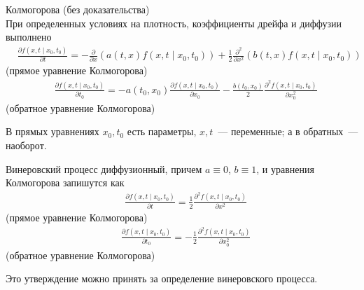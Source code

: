 \begin{theorem} Колмогорова (без доказательства)
    \\
    При определенных условиях на плотность, коэффициенты дрейфа и диффузии
    выполнено
    \begin{align*}
      & \frac{\partial f(x,t \mid x_0,t_0)}{\partial t} = -\frac{\partial}{\partial x}\left( a(t,x)f(x,t\mid x_0,t_0) \right) + \frac{1}{2}\frac{\partial^2}{\partial x^2}\left( b(t,x)f(x,t\mid x_0,t_0) \right)
    \end{align*}
    (прямое уравнение Колмогорова)
    \begin{align*}
      & \frac{\partial f(x,t \mid x_0,t_0)}{\partial t_0} = -a(t_0,x_0) \frac{\partial f(x,t\mid x_0,t_0)}{\partial x_0} - \frac{b(t_0,x_0)}{2} \frac{\partial^2 f(x,t\mid x_0,t_0)}{\partial x_0^2}
    \end{align*}
    (обратное уравнение Колмогорова)  
\end{theorem}
В прямых уравнениях $x_0, t_0$ есть параметры, $x,t$~--- переменные; а в
обратных~--- наоборот.
\begin{Prop}
    Винеровский процесс диффузионный, причем $a \equiv 0$, $b \equiv 1$, и
    уравнения Колмогорова запишутся как
    \begin{align*}
      & \frac{\partial f(x,t \mid x_0,t_0)}{\partial t} = \frac{1}{2}\frac{\partial^2f(x,t\mid x_0,t_0)}{\partial x^2}
    \end{align*}
    (прямое уравнение Колмогорова)
    \begin{align*}
      & \frac{\partial f(x,t \mid x_0,t_0)}{\partial t_0} = - \frac{1}{2} \frac{\partial^2 f(x,t\mid x_0,t_0)}{\partial x_0^2}
    \end{align*}
    (обратное уравнение Колмогорова)    
\end{Prop}
\begin{Note}
    Это утверждение можно принять за определение винеровского процесса.
\end{Note}